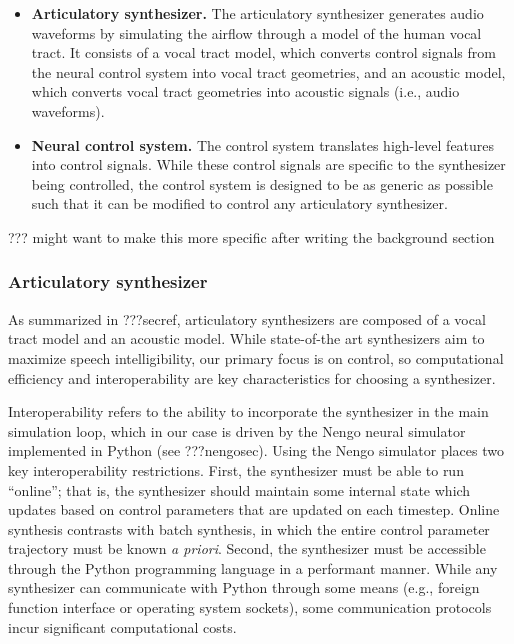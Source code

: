 \begin{itemize}
\item \textbf{Articulatory synthesizer.} The articulatory synthesizer
  generates audio waveforms
  by simulating the airflow through a model of the human vocal tract.
  It consists of a vocal tract model,
  which converts control signals from the neural control system
  into vocal tract geometries,
  and an acoustic model,
  which converts vocal tract geometries into acoustic signals
  (i.e., audio waveforms).
\item \textbf{Neural control system.} The control system
  translates high-level features into control signals.
  While these control signals are specific to the
  synthesizer being controlled,
  the control system is designed to be as generic
  as possible such that it can be modified to control
  any articulatory synthesizer.
\end{itemize}

??? might want to make this more specific after writing
the background section

\subsubsection{Articulatory synthesizer}

As summarized in ???secref,
articulatory synthesizers are composed
of a vocal tract model and an acoustic model.
While state-of-the art synthesizers aim to
maximize speech intelligibility,
our primary focus is on control,
so computational efficiency
and interoperability are
key characteristics for choosing a synthesizer.

Interoperability refers to the ability
to incorporate the synthesizer
in the main simulation loop,
which in our case is driven by
the Nengo neural simulator
implemented in Python
(see ???nengosec).
Using the Nengo simulator places
two key interoperability restrictions.
First, the synthesizer must
be able to run ``online'';
that is, the synthesizer should maintain
some internal state which updates
based on control parameters
that are updated on each timestep.
Online synthesis contrasts with
batch synthesis, in which
the entire control parameter trajectory
must be known \textit{a priori}.
Second, the synthesizer must
be accessible through the Python
programming language in a performant manner.
While any synthesizer can communicate
with Python through some means
(e.g., foreign function interface
or operating system sockets),
some communication protocols incur
significant computational costs.

